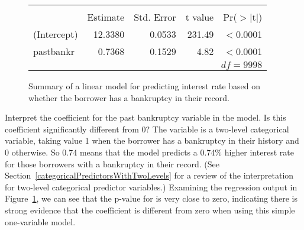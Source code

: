 \begin{figure}[h]
\centering
\begin{tabular}{l rrr r}
  \hline
  \vspace{-3.7mm} & & & & \\
  & Estimate & Std. Error & t value & Pr($>$$|$t$|$) \\ 
  \hline
  (Intercept) & 12.3380 & 0.0533 & 231.49 & $<$0.0001 \\ 
  past\us{}bankr & 0.7368 & 0.1529 & 4.82 & $<$0.0001 \\ 
  \hline
  &&&\multicolumn{2}{r}{$df=9998$}
\end{tabular}
\caption{Summary of a linear model for predicting
    interest rate based on whether the borrower has
    a bankruptcy in their record.}
\label{intRateVsPastBankrModel}
\end{figure}



\begin{examplewrap}
\begin{nexample}{Interpret the coefficient for the
     past bankruptcy variable in the model.
     Is this coefficient significantly different from 0?}
  The  variable is a two-level categorical
  variable, taking value 1 when the borrower has a bankruptcy
  in their history and 0 otherwise.
  So 0.74 means that the model predicts a 0.74\% higher
  interest rate for those borrowers with a bankruptcy in
  their record.
  (See Section~\ref{categoricalPredictorsWithTwoLevels}
  for a review of the interpretation for two-level
  categorical predictor variables.)
  Examining the regression output in
  Figure~\ref{intRateVsPastBankrModel},
  we can see that the p-value for 
  is very close to zero, indicating there is strong evidence
  that the coefficient is different from zero when using this
  simple one-variable model.
\end{nexample}
\end{examplewrap}

